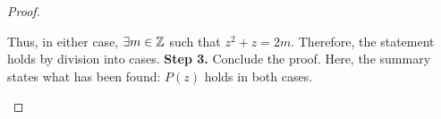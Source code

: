 \begin{proof}
{    \begin{annotatedpanel}[Conclusion.]{
        Thus, in either case, $\exists m \in \mathbb{Z}$ such that %
        \mbox{$z^2 + z = 2m$}. %
        Therefore, the statement holds by division into cases. \qedhere
    }{
        \textbf{Step 3.} Conclude the proof. %
        Here, the summary states what has been found: %
        $P(z)$ holds in both cases.
    }
    \end{annotatedpanel}
}
\end{proof}